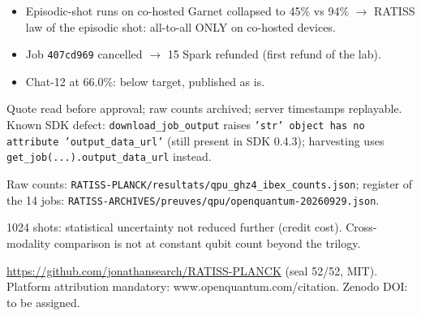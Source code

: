 \documentclass[10pt]{article}
\begin{document}
\begin{itemize}
  \item Episodic-shot runs on co-hosted Garnet collapsed to 45\% vs 94\% $\rightarrow$
        RATISS law of the episodic shot: all-to-all ONLY on co-hosted devices.
  \item Job \texttt{407cd969} cancelled $\rightarrow$ 15 Spark refunded (first refund of the lab).
  \item Chat-12 at 66.0\%: below target, published as is.
\end{itemize}

Quote read before approval; raw counts archived; server timestamps replayable.
Known SDK defect: \texttt{download\_job\_output} raises
\texttt{'str' object has no attribute 'output\_data\_url'} (still present in SDK 0.4.3);
harvesting uses \texttt{get\_job(...).output\_data\_url} instead.

Raw counts: \texttt{RATISS-PLANCK/resultats/qpu\_ghz4\_ibex\_counts.json};
register of the 14 jobs: \texttt{RATISS-ARCHIVES/preuves/qpu/openquantum-20260929.json}.

1024 shots: statistical uncertainty not reduced further (credit cost).
Cross-modality comparison is not at constant qubit count beyond the trilogy.

\url{https://github.com/jonathansearch/RATISS-PLANCK} (seal 52/52, MIT).
Platform attribution mandatory: www.openquantum.com/citation. Zenodo DOI: to be assigned.

\sourcefoot
\end{document}
